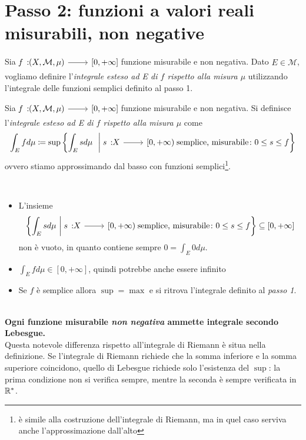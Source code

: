 \section{Passo 2: funzioni a valori reali misurabili, non negative}
Sia $\funz{f}{\left(X,\mathcal{M},\mu\right)}{\left[0,+\infty\right]}$ funzione misurabile e non negativa. Dato $E\in\mathcal{M}$, vogliamo definire l'\textit{integrale esteso ad E di $f$ rispetto alla misura $\mu$} utilizzando l'integrale delle funzioni semplici definito al passo 1. 
\begin{define}
	Sia $\funz{f}{\left(X,\mathcal{M},\mu\right)}{\left[0,+\infty\right]}$ funzione misurabile e non negativa. Si definisce l'\textit{integrale esteso ad E di $f$ rispetto alla misura $\mu$} come
	\begin{equation}
		\int_Efd\mu\coloneqq\sup\left\{\int_Esd\mu\ \ \middle| \  \funz{s}{X}{\left[0,+\infty\right)}\text{ semplice, misurabile}\colon0\leq s\leq f\right\}
	\end{equation}
ovvero stiamo approssimando dal basso con funzioni semplici\footnote{è simile alla costruzione dell'integrale di Riemann, ma in quel caso serviva anche l'approssimazione dall'alto}.
\end{define}
\begin{observe}~{}
	\begin{itemize}
		\item L'insieme
		\begin{equation*}
			\left\{\int_Esd\mu\ \middle|\ \funz{s}{X}{\left[0,+\infty\right)}\text{ semplice, misurabile}\colon0\leq s\leq f\right\}\subseteq \left[0,+\infty\right]
		\end{equation*} non è vuoto, in quanto contiene sempre $0=\int_E 0d\mu$.
		\item $\int_Efd\mu\in\left[0,+\infty\right]$, quindi potrebbe anche essere infinito
		\item Se $f$ è semplice allora $\sup=\max$ e si ritrova l'integrale definito al \textit{passo 1}.
	\end{itemize}
\end{observe}
\begin{attention}~{}\\
	\textbf{Ogni funzione misurabile \textit{non negativa} ammette integrale secondo Lebesgue.}\\
	Questa notevole differenza rispetto all'integrale di Riemann è situa nella definizione. Se l'integrale di Riemann richiede che la somma inferiore e la somma superiore coincidono, quello di Lebesgue richiede solo l'esistenza del $\sup$: la prima condizione non si verifica sempre, mentre la seconda è sempre verificata in $\mathbb{R}^{\ast}$.
\end{attention}
